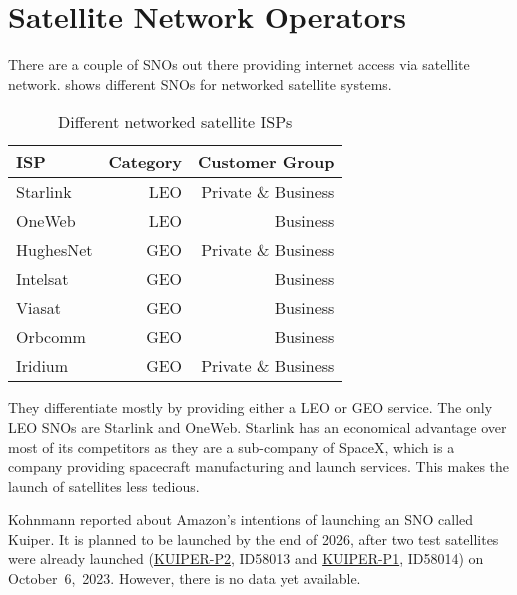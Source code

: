 \section{Satellite Network Operators} \label{sec:isps}

There are a couple of \ac{SNO}s out there providing internet access via
satellite network.  shows different \ac{SNO}s for
networked satellite systems.

\begin{table}[]
	\caption{Different networked satellite ISPs}
	\label{fig:satellite-isp}
	\begin{tabular}{lrr}
		\toprule
		ISP       & Category & Customer Group      \\
		\midrule
		Starlink  & LEO      & Private \& Business \\
		OneWeb    & LEO      & Business            \\
		HughesNet & GEO      & Private \& Business \\
		Intelsat  & GEO      & Business            \\
		Viasat    & GEO      & Business            \\
		Orbcomm   & GEO      & Business            \\
		Iridium   & GEO      & Private \& Business \\
		\bottomrule
	\end{tabular}
\end{table}

They differentiate mostly by providing either a \ac{LEO} or \ac{GEO} service.
The only \ac{LEO} \ac{SNO}s are Starlink and OneWeb. Starlink has an economical
advantage over most of its competitors as they are a sub-company of SpaceX,
which is a company providing spacecraft manufacturing and launch services.
This makes the launch of satellites less tedious.

Kohnmann \cite{Kohnmann24} reported about Amazon's intentions of launching an
\ac{SNO} called Kuiper. It is planned to be launched by the end of 2026, after
two test satellites were already launched
(\href{https://www.n2yo.com/satellite/?s=58014}{KUIPER-P2}, ID58013 and
\href{https://www.n2yo.com/satellite/?s=58013}{KUIPER-P1}, ID58014) on
October~6,~2023. However, there is no data yet available.

